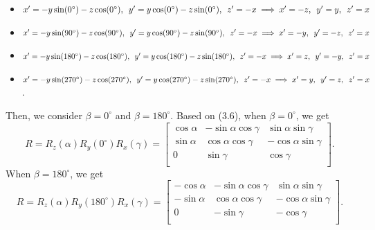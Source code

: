 \begin{itemize}
  \item  $x'=-y\sin(0^{\circ})-z\cos(0^{\circ}),\hspace{5pt} y'=y\cos(0^{\circ})-z\sin(0^{\circ}),\hspace{5pt} z'=-x \\\implies x'=-z,\hspace{5pt} y'=y,\hspace{5pt} z'=x$
  \item  $x'=-y\sin(90^{\circ})-z\cos(90^{\circ}),\hspace{5pt} y'=y\cos(90^{\circ})-z\sin(90^{\circ}),\hspace{5pt} z'=-x\\\implies x'=-y,\hspace{5pt} y'=-z,\hspace{5pt} z'=x$
  \item  $x'=-y\sin(180^{\circ})-z\cos(180^{\circ}),\hspace{5pt} y'=y\cos(180^{\circ})-z\sin(180^{\circ}),\hspace{5pt} z'=-x\\\implies x'=z,\hspace{5pt} y'=-y,\hspace{5pt} z'=x$
  \item  $x'=-y\sin(270^{\circ})-z\cos(270^{\circ}),\hspace{5pt} y'=y\cos(270^{\circ})-z\sin(270^{\circ}),\hspace{5pt} z'=-x\\\implies x'=y, \hspace{5pt}y'=z,\hspace{5pt} z'=x$.
  \label{3Drotation24situations2}
\end{itemize}
Then, we consider  $\beta=0^{\circ}$ and $\beta=180^{\circ}$. Based on (3.6), when $\beta=0^{\circ}$, we get
\begin{equation}
R=R_{z}(\alpha)R_{y}(0^{\circ})R_{x}(\gamma)=
\begin{bmatrix}
\cos\alpha&-\sin\alpha\cos\gamma&\sin\alpha\sin\gamma\\
\sin\alpha&\cos\alpha\cos\gamma&-\cos\alpha\sin\gamma\\
0&          \sin\gamma&\cos\gamma\\
\end{bmatrix}.
\end{equation}
When $\beta=180^{\circ}$, we get
\begin{equation}
R=R_{z}(\alpha)R_{y}(180^{\circ})R_{x}(\gamma)=
\begin{bmatrix}
-\cos\alpha&-\sin\alpha\cos\gamma&\sin\alpha\sin\gamma\\
-\sin\alpha&\cos\alpha\cos\gamma&-\cos\alpha\sin\gamma\\
0&                               -\sin\gamma&-\cos\gamma\\
\end{bmatrix}.
\end{equation}

